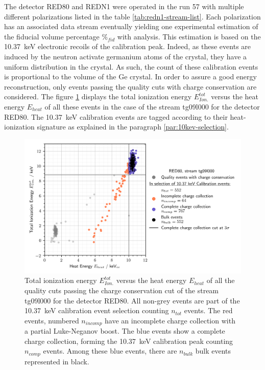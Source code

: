The detector RED80 and REDN1 were operated in the run 57 with multiple different polarizations listed in the table \ref{tab:redn1-stream-list}. Each polarization has an associated data stream eventually yielding one experimental estimation of the fiducial volume percentage $\%_{fid}$ with analysis. 
This estimation is based on the \SI{10.37}{\kilo\eV} electronic recoils of the calibration peak. Indeed, as these events are induced by the neutron activate germanium atoms of the crystal, they have a uniform distribution in the crystal. As such, the count of these calibration events is proportional to the volume of the Ge crystal. 
In order to assure a good energy reconstruction, only events passing the quality cuts with charge conservation are considered. The figure \ref{fig:fiducial-count} displays the total ionization energy $E_{Ion.}^{tot}$ versus the heat energy $E_{heat}$ of all these events in the case of the stream tg09l000 for the detector RED80. The \SI{10.37}{\kilo\eV} calibration events are tagged according to their heat-ionization signature as explained in the paragraph \ref{par:10kev-selection}.

\begin{figure}
\centering
\includegraphics[scale=1]{Figures/ElectrodesExperimental/fiducial_counts.png}
\caption{Total ionization energy $E_{Ion.}^{tot}$ versus the heat energy $E_{heat}$ of all the quality cuts passing the charge conservation cut of the stream tg09l000 for the detector RED80. All non-grey events are part of the \SI{10.37}{\kilo\eV} calibration event selection counting $n_{tot}$ events. The red events, numbered $n_{incomp}$ have an incomplete charge collection with a partial Luke-Neganov boost. The blue events show a complete charge collection, forming the \SI{10.37}{\kilo\eV} calibration peak counting $n_{comp}$ events. Among these blue events, there are $n_{bulk}$ bulk events represented in black.}
\label{fig:fiducial-count}
\end{figure}

